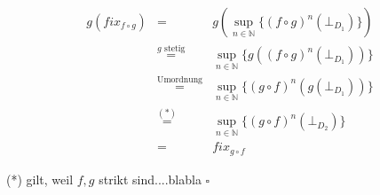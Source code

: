 \documentclass[11pt,a4paper,ngerman]{article}
\begin{document}
\begin{eqnarray*}
g (fix_{f \circ g}) &=& g(\sup_{n \in \mathbb{N}} \{(f \circ g)^n(\bot_{D_1}) \}) \\
&\stackrel{g \text{ stetig}}{=}& \sup_{n \in \mathbb{N}} \{g((f \circ g)^n(\bot_{D_1})) \}\\
&\stackrel{\text{Umordnung}}{=}& \sup_{n \in \mathbb{N}} \{(g \circ f)^n(g(\bot_{D_1})) \}\\
&\stackrel{(*)}{=}& \sup_{n \in \mathbb{N}} \{(g \circ f)^n(\bot_{D_2}) \}\\
&=& fix_{g\circ f}
\end{eqnarray*}

(*) gilt, weil $f,g$ strikt sind....blabla
\mbox{} \hfill $\square$
\label{LastPage}
\end{document}
